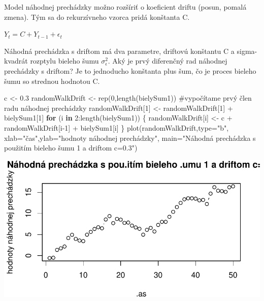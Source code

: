 \documentclass[
  letterpaper,
  DIV=11,
  numbers=noendperiod]{scrreprt}
\newenvironment{Shaded}{\begin{snugshade}}{\end{snugshade}}
\newcommand{\AttributeTok}[1]{\textcolor[rgb]{0.40,0.45,0.13}{#1}}
\newcommand{\CommentTok}[1]{\textcolor[rgb]{0.37,0.37,0.37}{#1}}
\newcommand{\ControlFlowTok}[1]{\textcolor[rgb]{0.00,0.23,0.31}{\textbf{#1}}}
\newcommand{\DecValTok}[1]{\textcolor[rgb]{0.68,0.00,0.00}{#1}}
\newcommand{\FloatTok}[1]{\textcolor[rgb]{0.68,0.00,0.00}{#1}}
\newcommand{\FunctionTok}[1]{\textcolor[rgb]{0.28,0.35,0.67}{#1}}
\newcommand{\NormalTok}[1]{\textcolor[rgb]{0.00,0.23,0.31}{#1}}
\newcommand{\OtherTok}[1]{\textcolor[rgb]{0.00,0.23,0.31}{#1}}
\newcommand{\SpecialCharTok}[1]{\textcolor[rgb]{0.37,0.37,0.37}{#1}}
\newcommand{\StringTok}[1]{\textcolor[rgb]{0.13,0.47,0.30}{#1}}
\begin{document}
Model náhodnej prechádzky možno rozšíriť o koeficient driftu (posun,
pomalá zmena). Tým sa do rekurzívneho vzorca pridá konštanta C.

\(Y_t = C + Y_{t-1} + \epsilon_t\)

Náhodná prechádzka s driftom má dva parametre, driftovú konštantu C a
sigma-kvadrát rozptylu bieleho šumu \(\sigma^2_{\epsilon}\). Aký je prvý
diferenčný rad náhodnej prechádzky s driftom? Je to jednoducho konštanta
plus šum, čo je proces bieleho šumu so strednou hodnotou C.

\begin{Shaded}
\begin{Highlighting}[]
\NormalTok{c }\OtherTok{\textless{}{-}} \FloatTok{0.3}
\NormalTok{randomWalkDrift }\OtherTok{\textless{}{-}} \FunctionTok{rep}\NormalTok{(}\DecValTok{0}\NormalTok{,}\FunctionTok{length}\NormalTok{(bielySum1))}
\CommentTok{\#vypočítame prvý člen radu náhodnej prechádzky }
\NormalTok{randomWalkDrift[}\DecValTok{1}\NormalTok{] }\OtherTok{\textless{}{-}}\NormalTok{ randomWalkDrift[}\DecValTok{1}\NormalTok{] }\SpecialCharTok{+}\NormalTok{ bielySum1[}\DecValTok{1}\NormalTok{]}
\ControlFlowTok{for}\NormalTok{ (i }\ControlFlowTok{in} \DecValTok{2}\SpecialCharTok{:}\FunctionTok{length}\NormalTok{(bielySum1)) \{}
\NormalTok{    randomWalkDrift[i] }\OtherTok{\textless{}{-}}\NormalTok{ c }\SpecialCharTok{+}\NormalTok{ randomWalkDrift[i}\DecValTok{{-}1}\NormalTok{] }\SpecialCharTok{+}\NormalTok{ bielySum1[i]}
\NormalTok{\}}
\FunctionTok{plot}\NormalTok{(randomWalkDrift,}\AttributeTok{type=}\StringTok{"b"}\NormalTok{, }\AttributeTok{xlab=}\StringTok{"čas"}\NormalTok{,}\AttributeTok{ylab=}\StringTok{"hodnoty náhodnej prechádzky"}\NormalTok{, }\AttributeTok{main=}\StringTok{"Náhodná prechádzka s použitím bieleho šumu 1 a driftom c=0.3"}\NormalTok{)}
\end{Highlighting}
\end{Shaded}

\includegraphics{prednaska3_NahodnaPrechadzkaStacionarita_files/figure-pdf/unnamed-chunk-8-1.pdf}
\end{document}

